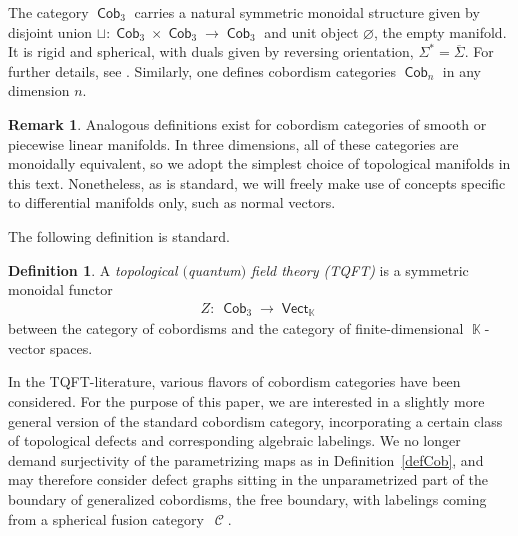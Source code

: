 \documentclass[pdftex]{sigma}
\DeclareMathOperator{\vect}{\mathsf{Vect}}
\DeclareMathOperator{\K}{\mathbb{K}}
\DeclareMathOperator{\Cob}{\mathsf{Cob}}
\DeclareMathOperator{\calc}{\mathcal{C}}
\numberwithin{equation}{section}
\theoremstyle{definition}
\newtheorem{Definition}[Definition]{Definition}
\newtheorem{Remark}[Remark]{Remark}
\begin{document}
The category $\Cob_3$ carries a natural symmetric monoidal structure given by disjoint union $\sqcup\colon \Cob_3 \times \Cob_3 \rightarrow \Cob_3$ and unit object $\varnothing$, the empty manifold. It is rigid and spherical, with duals given by reversing orientation, $\Sigma^* = \overline{\Sigma}$. For further details, see \cite[Section 10.1]{TV}. Similarly, one defines cobordism categories $\Cob_n$ in any dimension $n$.
\begin{Remark}
 \label{remTopPL}
 Analogous definitions exist for cobordism categories of smooth or piecewise linear manifolds. In three dimensions, all of these categories are monoidally equivalent, so we adopt the simplest choice of topological manifolds in this text. Nonetheless, as is standard, we will freely make use of concepts specific to differential manifolds only, such as normal vectors.
\end{Remark}
The following definition is standard.
\begin{Definition}
 \label{defTQFT}
 A \textit{topological $($quantum$)$ field theory (TQFT)} is a symmetric monoidal functor
 \begin{align*}
 Z\colon \ \Cob_3 \rightarrow \vect_{\K}
 \end{align*}
 between the category of cobordisms and the category of finite-dimensional $\K$-vector spaces.
\end{Definition}
In the TQFT-literature, various flavors of cobordism categories have been considered. For the purpose of this paper, we are interested in a slightly more general version of the standard cobordism category, incorporating a certain class of topological defects and corresponding algebraic labelings. We no longer demand surjectivity of the parametrizing maps as in Definition~\ref{defCob}, and may therefore consider defect graphs sitting in the unparametrized part of the boundary of generalized cobordisms, the free boundary, with labelings coming from a spherical fusion category~$\calc$.
\end{document}
